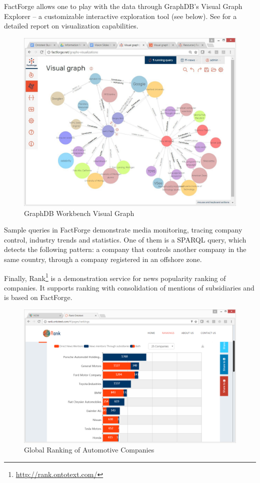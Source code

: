 \documentclass[runningheads,a4paper]{llncs}
\makeatletter
\def\maxwidth#1{\ifdim\Gin@nat@width>#1 #1\else\Gin@nat@width\fi}
\makeatother
\begin{document}
FactForge allows one to play with the data through GraphDB's Visual Graph Explorer -- a customizable interactive exploration tool (see below). See  \cite{__RefNumPara__861_1597909725} for a detailed report on visualization capabilities.
\begin{figure}[h!]
\centering
\includegraphics[width=\maxwidth{\textwidth}]{img/10000000000004C6000003CAC18C2FE88D2DB2C9.jpg}
\cprotect\caption{GraphDB Workbench Visual Graph}
\label{}
\end{figure}


Sample queries in FactForge demonstrate media monitoring, tracing company control, industry trends and statistics. One of them is a SPARQL query, which detects the following pattern: a company that controls another company in the same country, through a company registered in an offshore zone.

Finally, Rank\footnote{\url{http://rank.ontotext.com/}} is a demonstration service for news popularity ranking of companies. It supports ranking with consolidation of mentions of subsidiaries and is based on FactForge.
\begin{figure}[h!]
\centering
\includegraphics[width=\maxwidth{\textwidth}]{img/100000000000059F000003895E1D5B579C4B90E8.png}
\cprotect\caption{Global Ranking of Automotive Companies}
\label{}
\end{figure}
\end{document}
